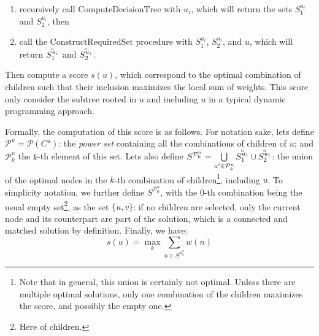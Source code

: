    			\begin{enumerate}
   				\item recursively call $\text{ComputeDecisionTree}$ with $u_i$, which will return the sets $S^{u_i}_1$ and $S^{u_i}_2$, then
   				\item call the $\text{ConstructRequiredSet}$ procedure with $S^{u_i}_1$, $S^{u_i}_2$, and $u$, which will return $\accentset{\circ}{S^{u_i}_1}$ and $\accentset{\circ}{S^{u_i}_2}$.
   			\end{enumerate} 
   			Then compute a score $s(u)$, which correspond to the optimal combination of children such that their inclusion maximizes the local sum of weights.
   			This score only consider the subtree rooted in $u$ and including $u$ in a typical dynamic programming approach.
   
   			Formally, the computation of this score is as follows.
   			For notation sake, lets define $\mathcal{P}^u = \mathcal{P}\left({C^u}\right)$: the \emph{power set} containing all the combinations of children of $u$; and $\mathcal{P}^u_k$ the $k$-th element of this set.
   			Lets also define $S^{\mathcal{P}^u_k} = \bigcup\limits_{u^i \in \mathcal{P}^u_k}{\accentset{\circ}{S^{u_i}_1} \cup \accentset{\circ}{S^{u_i}_2}}$: the union of the optimal nodes in the $k$-th combination of children\footnote{Note that in general, this union is certainly not optimal. Unless there are multiple optimal solutions, only one combination of the children maximizes the score, and possibly the empty one.}, including $u$.
   			To simplicity notation, we further define $S^{\mathcal{P}^u_0}$, with the $0$-th combination being the usual empty set\footnote{Here of children.}, as the set $\{u, v\}$: if no children are selected, only the current node and its counterpart are part of the solution, which is a connected and matched solution by definition.
   			Finally, we have:
   			\[
   				s(u) = \max\limits_{k}{\sum\limits_{n \in S^{\mathcal{P}^u_k}}{w\left(n\right)}}
   			\]
   
